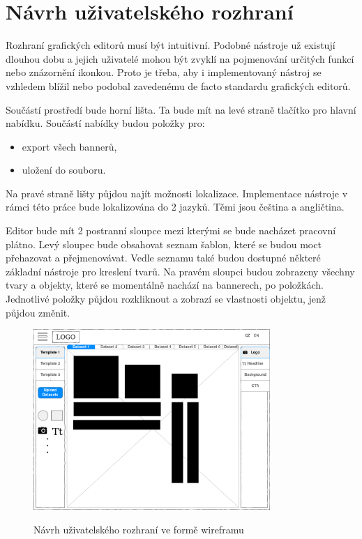     \section{Návrh uživatelského rozhraní}
    Rozhraní grafických editorů musí být intuitivní. Podobné nástroje už existují dlouhou dobu a jejich uživatelé mohou být zvyklí na pojmenování určitých funkcí
    nebo znázornění ikonkou. Proto je třeba, aby i implementovaný nástroj se vzhledem blížil nebo podobal zavedenému de facto standardu grafických editorů. 

    Součástí prostředí bude horní lišta. Ta bude mít na levé straně tlačítko pro hlavní nabídku. Součástí nabídky budou položky pro:
    \begin{itemize}
        \item export všech bannerů,
        \item uložení do souboru.
    \end{itemize}
    Na pravé straně lišty půjdou najít možnosti lokalizace. Implementace nástroje v rámci této práce bude lokalizována do 2 jazyků. Těmi jsou čeština a angličtina. 

    Editor bude mít 2 postranní sloupce mezi kterými se bude nacházet pracovní plátno. Levý sloupec bude obsahovat seznam šablon,
    které se budou moct přehazovat a přejmenovávat. Vedle seznamu také budou dostupné některé základní nástroje pro kreslení tvarů.
    Na pravém sloupci budou zobrazeny všechny tvary a objekty, které se momentálně nachází na bannerech, po položkách.
    Jednotlivé položky půjdou rozkliknout a zobrazí se vlastnosti objektu, jenž půjdou změnit.

    \begin{figure}[ht]
        \centering
        \includegraphics[width=0.8\textwidth]{Figures/wireframe.png}
        \label{fig:ui-wireframe}
        \caption[Wireframe UI]{Návrh uživatelského rozhraní ve formě wireframu}
    \end{figure}

